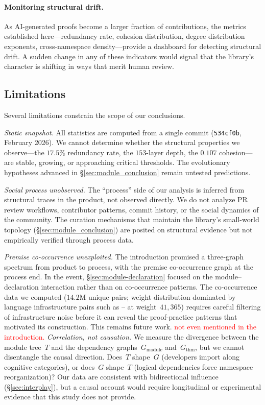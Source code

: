 \paragraph{Monitoring structural drift.} As AI-generated proofs become a larger fraction of  contributions, the metrics established here---redundancy rate, cohesion distribution, degree distribution exponents, cross-namespace density---provide a dashboard for detecting structural drift. A sudden change in any of these indicators would signal that the library's character is shifting in ways that merit human review.

\subsection{Limitations}
\label{sec:limitations}

Several limitations constrain the scope of our conclusions.

\emph{Static snapshot.} All statistics are computed from a single commit (\texttt{534cf0b}, February 2026). We cannot determine whether the structural properties we observe---the $17.5\%$ redundancy rate, the $153$-layer depth, the $0.107$ cohesion---are stable, growing, or approaching critical thresholds. The evolutionary hypotheses advanced in \S\ref{sec:module_conclusion} remain untested predictions.

\emph{Social process unobserved.} The ``process'' side of our analysis is inferred from structural traces in the product, not observed directly. We do not analyze PR review workflows, contributor patterns, commit history, or the social dynamics of the  community. The curation mechanisms that maintain the library's small-world topology (\S\ref{sec:module_conclusion}) are posited on structural evidence but not empirically verified through process data.

\emph{Premise co-occurrence unexploited.} The introduction promised a three-graph spectrum from product to process, with the premise co-occurrence graph at the process end. In the event, \S\ref{sec:module-declaration} focused on the module--declaration interaction rather than on co-occurrence patterns. The co-occurrence data we computed ($14.2$M unique pairs; weight distribution dominated by language infrastructure pairs such as --\allowbreak{} at weight~$41{,}365$) requires careful filtering of infrastructure noise before it can reveal the proof-practice patterns that motivated its construction. This remains future work.
\textcolor{red}{not even mentioned in the introduction.}
\emph{Correlation, not causation.} We measure the divergence between the module tree~$T$ and the dependency graphs~$G_{\mathrm{module}}$ and~$G_{\mathrm{thm}}$, but we cannot disentangle the causal direction. Does~$T$ shape~$G$ (developers import along cognitive categories), or does~$G$ shape~$T$ (logical dependencies force namespace reorganization)? Our data are consistent with bidirectional influence (\S\ref{sec:interplay}), but a causal account would require longitudinal or experimental evidence that this study does not provide.


